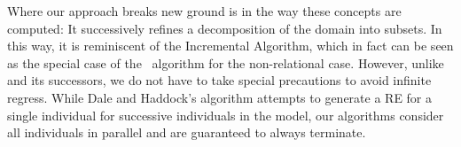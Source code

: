 

Where our approach breaks new ground is in the way these concepts
are computed: It successively
refines a decomposition of the domain into subsets.  In this way, it
is reminiscent of the Incremental Algorithm, which in fact can be seen
as the special case of the \el\ algorithm for the non-relational case.
However, unlike
 and its successors,
we do not have to take special precautions to avoid infinite regress. While Dale
and Haddock's algorithm attempts to generate a RE for a single
individual for successive individuals in the model, our algorithms
consider all individuals in parallel and are guaranteed to always terminate.








